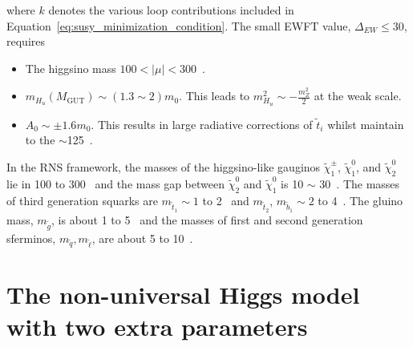 % 
where $k$ denotes the various loop contributions included in Equation~\ref{eq:susy_minimization_condition}.
The small EWFT value, $\Delta_{EW} \leq 30$, requires
%
\begin{itemize}
\item The higgsino mass $100 < |\mu| < 300$~{\GeV}. 
\item $m_{H_{u}}(M_{\text{GUT}}) \sim (1.3 \sim 2) m_{0}$. This leads to $m^{2}_{H_{u}} \sim - \frac{m^{2}_{Z}}{2}$ at the weak scale.
\item $A_{0} \sim \pm 1.6 m_{0}$. This results in large radiative corrections of $\widetilde{t}_{i}$ whilst maintain \mh to the $\sim$125~{\GeV}.
\end{itemize}
%
In the RNS framework, the masses of the higgsino-like gauginos $\widetilde{\chi}^{\pm}_{1}$, $\widetilde{\chi}^{0}_{1}$, and $\widetilde{\chi}^{0}_{2}$ lie in 100 to 300~{\GeV} and the mass gap between $\widetilde{\chi}^{0}_{2}$ and $\widetilde{\chi}^{0}_{1}$ is 10 $\sim$ 30~{\GeV}.
The masses of third generation squarks are $m_{\widetilde{t}_{1}} \sim 1$ to 2~{\TeV} and $m_{\widetilde{t}_{2}}$, $m_{\widetilde{b}_{1}} \sim 2$ to 4~{\TeV}.
The gluino mass, $m_{\widetilde{g}}$, is about 1 to 5~{\TeV} and the masses of first and second generation sferminos, $m_{\widetilde{q}}, m_{\widetilde{\ell}}$, are about 5 to 10~{\TeV}.








\section{The non-universal Higgs model with two extra parameters}
\label{sec:susy_nuhm2}